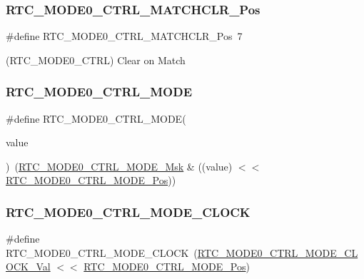 \subsubsection{\texorpdfstring{RTC\_MODE0\_CTRL\_MATCHCLR\_Pos}{RTC\_MODE0\_CTRL\_MATCHCLR\_Pos}}
{\footnotesize\ttfamily \#define R\+T\+C\+\_\+\+M\+O\+D\+E0\+\_\+\+C\+T\+R\+L\+\_\+\+M\+A\+T\+C\+H\+C\+L\+R\+\_\+\+Pos~7}



(R\+T\+C\+\_\+\+M\+O\+D\+E0\+\_\+\+C\+T\+RL) Clear on Match 

\mbox{\label{group___s_a_m_d21___r_t_c_ga84d4481ad3fcbe08e608ed0a61e58be8}} 
\subsubsection{\texorpdfstring{RTC\_MODE0\_CTRL\_MODE}{RTC\_MODE0\_CTRL\_MODE}}
{\footnotesize\ttfamily \#define R\+T\+C\+\_\+\+M\+O\+D\+E0\+\_\+\+C\+T\+R\+L\+\_\+\+M\+O\+DE(\begin{DoxyParamCaption}\item[{}]{value }\end{DoxyParamCaption})~(\mbox{\hyperlink{group___s_a_m_d21___r_t_c_gaeec426251b057f5e326b2f5b6cfe7fdc}{R\+T\+C\+\_\+\+M\+O\+D\+E0\+\_\+\+C\+T\+R\+L\+\_\+\+M\+O\+D\+E\+\_\+\+Msk}} \& ((value) $<$$<$ \mbox{\hyperlink{group___s_a_m_d21___r_t_c_gad69ab30ae21239fef57f25647924669f}{R\+T\+C\+\_\+\+M\+O\+D\+E0\+\_\+\+C\+T\+R\+L\+\_\+\+M\+O\+D\+E\+\_\+\+Pos}}))}

\mbox{\label{group___s_a_m_d21___r_t_c_gabf3dee3efdad1b09e92d39c4bc0917d7}} 
\subsubsection{\texorpdfstring{RTC\_MODE0\_CTRL\_MODE\_CLOCK}{RTC\_MODE0\_CTRL\_MODE\_CLOCK}}
{\footnotesize\ttfamily \#define R\+T\+C\+\_\+\+M\+O\+D\+E0\+\_\+\+C\+T\+R\+L\+\_\+\+M\+O\+D\+E\+\_\+\+C\+L\+O\+CK~(\mbox{\hyperlink{group___s_a_m_d21___r_t_c_ga3fd2a53e11d3770694da13f53de79a53}{R\+T\+C\+\_\+\+M\+O\+D\+E0\+\_\+\+C\+T\+R\+L\+\_\+\+M\+O\+D\+E\+\_\+\+C\+L\+O\+C\+K\+\_\+\+Val}} $<$$<$ \mbox{\hyperlink{group___s_a_m_d21___r_t_c_gad69ab30ae21239fef57f25647924669f}{R\+T\+C\+\_\+\+M\+O\+D\+E0\+\_\+\+C\+T\+R\+L\+\_\+\+M\+O\+D\+E\+\_\+\+Pos}})}

